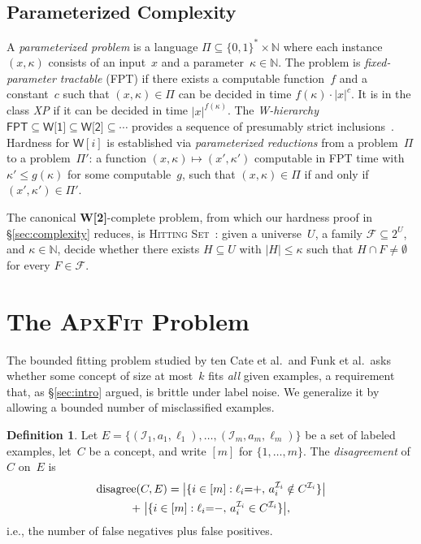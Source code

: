 \documentclass[accepted]{uai2026} %
\theoremstyle{definition}
\newtheorem{definition}[theorem]{Definition}
\theoremstyle{remark}
\newcommand{\AF}{\textsc{ApxFit}}
\begin{document}
\subsection{Parameterized Complexity}\label{sec:prelim:param}

A \emph{parameterized problem} is a language
$\Pi \subseteq \{0,1\}^* \times \mathbb{N}$ where each instance
$(x, \kappa)$ consists of an input~$x$ and a
parameter~$\kappa \in \mathbb{N}$. The problem is
\emph{fixed-parameter tractable} (FPT) if there exists a computable
function~$f$ and a constant~$c$ such that $(x,\kappa) \in \Pi$ can be
decided in time $f(\kappa) \cdot |x|^c$. It is in the class
\emph{XP} if it can be decided in time $|x|^{f(\kappa)}$.
The \emph{W-hierarchy}
$\textsf{FPT} \subseteq \textsf{W[1]} \subseteq
\textsf{W[2]} \subseteq \cdots$
provides a sequence of presumably strict
inclusions~\citep{DBLP:series/txcs/DowneyF13}. Hardness for
$\textsf{W}[i]$ is established via \emph{parameterized reductions}
from a problem~$\Pi$ to a problem~$\Pi'$:
a function $(x, \kappa) \mapsto (x', \kappa')$ computable in FPT
time with $\kappa' \leq g(\kappa)$ for some computable~$g$,
such that $(x, \kappa) \in \Pi$ if and only if
$(x', \kappa') \in \Pi'$.

The canonical \textbf{W[2]}-complete problem,
from which our hardness proof in \S\ref{sec:complexity}
reduces, is \textsc{Hitting
Set}~\citep{DBLP:series/txcs/DowneyF13}: given a universe~$U$,
a family $\mathcal{F} \subseteq 2^U$, and
$\kappa \in \mathbb{N}$, decide whether there exists
$H \subseteq U$ with $|H| \leq \kappa$ such that
$H \cap F \neq \emptyset$ for every $F \in \mathcal{F}$.

\section{The \AF{} Problem}\label{sec:problem}

The bounded fitting problem studied
by ten Cate et al.\ and Funk et al.\ asks whether some
concept of size at most~$k$ fits \emph{all} given examples, a
requirement that, as \S\ref{sec:intro} argued, is brittle
under label noise. We generalize it by allowing a bounded number
of misclassified examples.

\begin{definition}\label{def:disagree}  Let $E = \{(\mathcal{I}_1, a_1, \ell_1), \ldots,
  (\mathcal{I}_m, a_m, \ell_m)\}$ be a set of labeled examples,
  let~$C$ be a concept, and write $[m]$ for
  $\{1, \ldots, m\}$. The \emph{disagreement} of~$C$ on~$E$ is
  \begin{multline*}
    \textnormal{disagree}(C, E) =
    \bigl|\{ i \in [m] : \ell_i{=}{+},\,
      a_i^{\mathcal{I}_i} \notin C^{\mathcal{I}_i} \}\bigr|
    \\    +\;
    \bigl|\{ i \in [m] : \ell_i{=}{-},\,
      a_i^{\mathcal{I}_i} \in C^{\mathcal{I}_i} \}\bigr|,
  \end{multline*}
  i.e., the number of false negatives plus false positives.
\end{definition}
\end{document}
